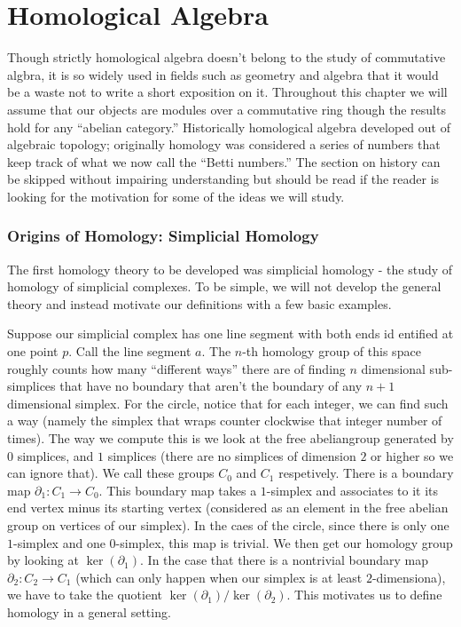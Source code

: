\chapter{Homological Algebra} 

Though strictly homological algebra doesn't
belong to the study of commutative algbra, it is so widely used in fields
such as geometry and algebra that it would be a waste not to write a short
exposition on it. Throughout this chapter we will assume that our objects are
modules over a commutative ring though the results hold for any ``abelian
category.'' Historically homological algebra developed out of algebraic
topology; originally homology was considered a series of numbers that keep
track of what we now call the ``Betti numbers.'' The section on history can
be skipped without impairing understanding but should be read if the reader
is looking for the motivation for some of the ideas we will study.

\subsection{Origins of Homology: Simplicial Homology}

The first homology theory
to be developed was simplicial homology - the study of homology of simplicial
complexes. To be simple, we will not develop the general theory and instead
motivate our definitions with a few basic examples.  

\begin{example} Suppose
our simplicial complex has one line segment with both ends id entified at
one point $p$. Call the line segment $a$. The $n$-th homology group of this
space roughly counts how many ``different ways'' there are of finding $n$
dimensional sub-simplices that have no boundary that aren't the boundary of
any $n+1$ dimensional simplex. For the circle, notice that for each integer,
we can find such a way (namely the simplex that wraps counter clockwise that
integer number of times). The way we compute this is we look at the free abeliangroup generated by $0$ simplices, and $1$ simplices (there are no simplices of
dimension $2$ or higher so we can ignore that). We call these groups $C_0$ and
$C_1$ respetively. There is a boundary map $\partial_1: C_1\rightarrow C_0$.
This boundary map takes a $1$-simplex and associates to it its end vertex minus
its starting vertex (considered as an element in the free abelian group on
vertices of our simplex). In the caes of the circle, since there is only one
$1$-simplex and one $0$-simplex, this map is trivial. We then get our homology
group by looking at $\ker(\partial_1)$. In the case that there is a nontrivial
boundary map $\partial_2: C_2\rightarrow C_1$ (which can only happen when our
simplex is at least $2$-dimensiona), we have to take the quotient
$\ker(\partial_1)/\ker(\partial_2)$. This motivates us to define homology in a
general setting.
\end{example}

